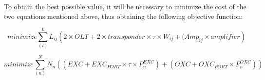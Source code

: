 To obtain the best possible value, it will be necessary to minimize the cost of the two equations mentioned above, thus obtaining the following objective function:

\begin{equation}
minimize
\sum_{(l)}^L L_{ij} \left(2 \times OLT + 2 \times transponder \times \tau \times W_{ij} + ( Amp_{ij} \times amplifier \right)
\label{obj_func}
\end{equation}

\begin{equation}
minimize
\sum_{(n)}^N N_{n} ( \left(EXC + EXC_{PORT} \times \tau \times P^{EXC}_{n} \right) + \left(OXC + OXC_{PORT} \times P^{OXC}_{n} \right) )
\label{obj_func1}
\end{equation}


